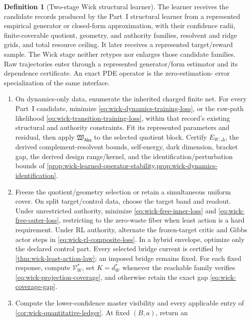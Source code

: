\documentclass[11pt]{article}
\numberwithin{section}{part}
\theoremstyle{plain}
\theoremstyle{definition}
\newtheorem{definition}[definition]{Definition}
\theoremstyle{remark}
\newcommand{\Abs}{\mathsf{Abs}}
\begin{document}
\begin{definition}[Two-stage Wick structural learner]
\label{def:wick-structural-learner}
The learner receives the candidate records produced by the Part~I structural
learner from a represented empirical generator or closed-form approximation,
with their confidence radii, finite-coverable quotient, geometry, and
authority families, resolvent and ridge grids, and total resource ceiling.
It later receives a represented target/reward sample.  The Wick stage neither
retypes nor enlarges those candidate families.
Raw trajectories enter through a represented generator/form estimator and
its dependence certificate.  An exact PDE operator is the zero-estimation-
error specialization of the same interface.

\begin{enumerate}[label=\textup{(L\arabic*)}]
\item On dynamics-only data, enumerate the inherited charged finite net.  For
every Part~I candidate, minimize \eqref{eq:wick-dynamics-training-loss}, or
the raw-path likelihood \eqref{eq:wick-transition-training-loss}, within
that record's existing structural and authority constraints.  Fit its
represented parameters and residual, then apply
\(\mathfrak W_{\Abs}\) to the selected quotient block.  Certify
\(E_{W,\Delta}\), the derived complement-resolvent bounds, self-energy,
dark dimension, bracket gap, the derived design range/kernel, and the
identification/perturbation
bounds of
\cref{prop:wick-learned-operator-stability,prop:wick-dynamics-identification}.
\item Freeze the quotient/geometry selection or retain a simultaneous
uniform cover.  On split target/control data, choose the target band and
readout.  Under unrestricted authority, minimize
\eqref{eq:wick-free-inner-loss} and
\eqref{eq:wick-free-outer-loss}, restricting to the zero-waste fiber when
least action is a hard requirement.  Under RL authority, alternate the
frozen-target critic and Gibbs actor steps in
\eqref{eq:wick-rl-composite-loss}.  In a hybrid envelope, optimize only the
declared control part.  Every selected bridge current is certified by
\cref{thm:wick-least-action-law}; an imposed bridge remains fixed.  For each
fixed response, compute \(\mathcal V_W^*\), set \(K=d_W^*\) whenever the
reachable family verifies \eqref{eq:wick-projection-coverage}, and otherwise
retain the exact gap \eqref{eq:wick-coverage-gap}.
\item Compute the lower-confidence master visibility and every applicable
entry of \cref{cor:wick-quantitative-ledger}.  At fixed \((B,a)\), return an

\end{enumerate}
\end{definition}
\end{document}
